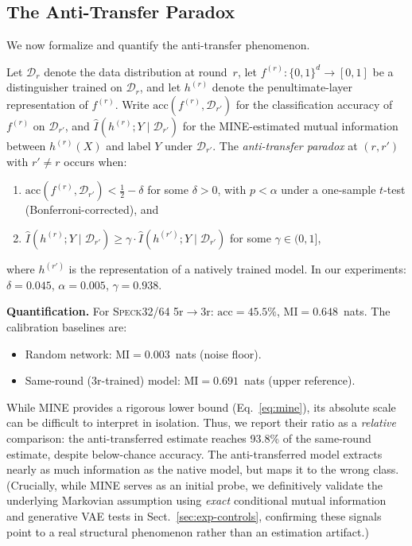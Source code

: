 \documentclass[runningheads]{llncs}
\newcommand{\speck}{\textsc{Speck32/64}\xspace}
\begin{document}

\subsection{The Anti-Transfer Paradox}
\label{sec:exp-paradox}

We now formalize and quantify the anti-transfer phenomenon.

\begin{definition}
\label{def:paradox}
Let $\mathcal{D}_r$ denote the data distribution at round~$r$,
let $f^{(r)}: \{0,1\}^d \to [0,1]$ be a distinguisher trained on $\mathcal{D}_r$,
and let $h^{(r)}$ denote the penultimate-layer representation of $f^{(r)}$.
Write $\mathrm{acc}(f^{(r)}, \mathcal{D}_{r'})$ for the classification accuracy
of $f^{(r)}$ on $\mathcal{D}_{r'}$, and
$\hat{I}(h^{(r)}; Y \mid \mathcal{D}_{r'})$ for the MINE-estimated
mutual information between $h^{(r)}(X)$ and label $Y$ under $\mathcal{D}_{r'}$.
The \emph{anti-transfer paradox} at $(r, r')$ with $r' \neq r$ occurs when:
\begin{enumerate}[label=(\roman*),itemsep=0pt]
  \item $\mathrm{acc}(f^{(r)}, \mathcal{D}_{r'}) < \tfrac{1}{2} - \delta$
        for some $\delta > 0$, with $p < \alpha$ under a one-sample
        $t$-test (Bonferroni-corrected), and
  \item $\hat{I}(h^{(r)}; Y \mid \mathcal{D}_{r'}) \geq
        \gamma \cdot \hat{I}(h^{(r')}; Y \mid \mathcal{D}_{r'})$
        for some $\gamma \in (0,1]$,
\end{enumerate}
where $h^{(r')}$ is the representation of a natively trained model.
In our experiments: $\delta = 0.045$, $\alpha = 0.005$, $\gamma = 0.938$.
\end{definition}

\textbf{Quantification.}
For \speck 5r$\to$3r: $\mathrm{acc} = 45.5\%$, $\mathrm{MI} = 0.648$~nats.
The calibration baselines are:
\begin{itemize}[itemsep=1pt,topsep=2pt]
  \item Random network: $\mathrm{MI} = 0.003$~nats (noise floor).
  \item Same-round (3r-trained) model: $\mathrm{MI} = 0.691$~nats (upper reference).
\end{itemize}
While MINE provides a rigorous lower bound (Eq.~\ref{eq:mine}), its absolute scale can be difficult to interpret in isolation. Thus, we report their ratio as a \emph{relative} comparison: the anti-transferred estimate reaches 93.8\% of the same-round estimate, despite below-chance accuracy.
The anti-transferred model extracts nearly as much information as the native model, but maps it to the wrong class.
(Crucially, while MINE serves as an initial probe, we definitively validate the underlying Markovian assumption using \emph{exact} conditional mutual information and generative VAE tests in Sect.~\ref{sec:exp-controls}, confirming these signals point to a real structural phenomenon rather than an estimation artifact.)
\end{document}
